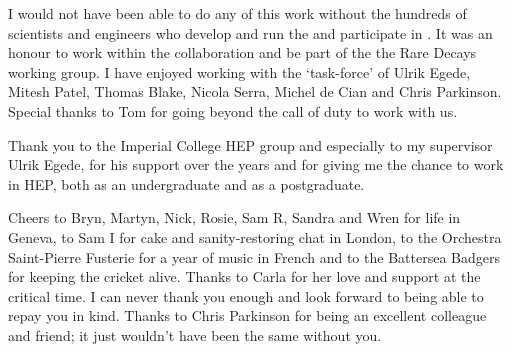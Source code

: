I would not have been able to do any of this work without the hundreds of 
scientists and engineers who develop and run the \lhc and participate in \cern.
It was an honour to work within the \lhcb collaboration and be part of the the Rare Decays working group.
I have enjoyed working with the \BdToKstmm `task-force' of
 Ulrik Egede, Mitesh Patel, Thomas Blake, Nicola Serra, Michel de Cian and Chris Parkinson.
Special thanks to Tom for going beyond the call of duty to work with us.

Thank you to the Imperial College HEP group and especially to my supervisor Ulrik Egede, 
for his support over the years and for giving me the chance to work in HEP, 
both as an undergraduate and as a postgraduate.

Cheers to Bryn, Martyn, Nick, Rosie, Sam R, Sandra and Wren for life in Geneva, 
to Sam I for cake and sanity-restoring chat in London,
to the Orchestra Saint-Pierre Fusterie for a year of music in French
and to the Battersea Badgers for keeping the cricket alive.
Thanks to Carla for her love and support at the critical time. I can never thank you enough and look forward to being able to repay you in kind.
Thanks to Chris Parkinson for being an excellent colleague and friend; it just wouldn't have been the same without you.

\doublepage


\setcounter{tocdepth}{2} %

\tableofcontents

